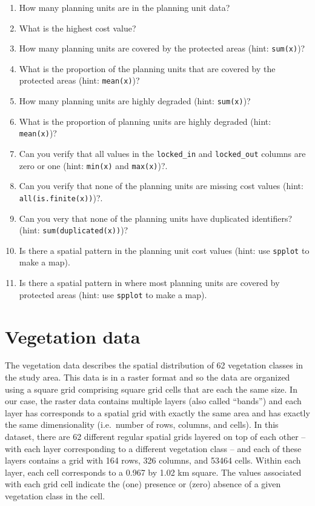 \documentclass[12pt,]{book}
\makeatletter
\providecommand{\tightlist}{%
  \setlength{\itemsep}{0pt}\setlength{\parskip}{0pt}}
\newenvironment{kframe}{%
\medskip{}
\setlength{\fboxsep}{.8em}
 \def\at@end@of@kframe{}%
 \ifinner\ifhmode%
  \def\at@end@of@kframe{\end{minipage}}%
  \begin{minipage}{\columnwidth}%
 \fi\fi%
 \def\FrameCommand##1{\hskip\@totalleftmargin \hskip-\fboxsep
 \colorbox{shadecolor}{##1}\hskip-\fboxsep
     \hskip-\linewidth \hskip-\@totalleftmargin \hskip\columnwidth}%
 \MakeFramed {\advance\hsize-\width
   \@totalleftmargin\z@ \linewidth\hsize
   \@setminipage}}%
 {\par\unskip\endMakeFramed%
 \at@end@of@kframe}
\newenvironment{rmdblock}[1]
  {
  \begin{itemize}
  \renewcommand{\labelitemi}{
    \raisebox{-.7\height}[0pt][0pt]{
      {\setkeys{Gin}{width=3em,keepaspectratio}\texttt{[image: images/\#1]}}
    }
  }
  \setlength{\fboxsep}{1em}
  \begin{kframe}
  \item
  }
  {
  \end{kframe}
  \end{itemize}
  }
\newenvironment{rmdquestion}
  {\begin{rmdblock}{question}}
  {\end{rmdblock}}
\makeatother
\begin{document}
\begin{rmdquestion}
\begin{enumerate}
\def\labelenumi{\arabic{enumi}.}
\tightlist
\item
  How many planning units are in the planning unit data?
\item
  What is the highest cost value?
\item
  How many planning units are covered by the protected areas (hint: \texttt{sum(x)})?
\item
  What is the proportion of the planning units that are covered by the protected areas (hint: \texttt{mean(x)})?
\item
  How many planning units are highly degraded (hint: \texttt{sum(x)})?
\item
  What is the proportion of planning units are highly degraded (hint: \texttt{mean(x)})?
\item
  Can you verify that all values in the \texttt{locked\_in} and \texttt{locked\_out} columns are zero or one (hint: \texttt{min(x)} and \texttt{max(x)})?.
\item
  Can you verify that none of the planning units are missing cost values (hint: \texttt{all(is.finite(x))})?.
\item
  Can you very that none of the planning units have duplicated identifiers? (hint: \texttt{sum(duplicated(x))})?
\item
  Is there a spatial pattern in the planning unit cost values (hint: use \texttt{spplot} to make a map).
\item
  Is there a spatial pattern in where most planning units are covered by protected areas (hint: use \texttt{spplot} to make a map).
\end{enumerate}
\end{rmdquestion}

\clearpage

\hypertarget{vegetation-data}{%
\section{Vegetation data}\label{vegetation-data}}

The vegetation data describes the spatial distribution of 62 vegetation classes in the study area. This data is in a raster format and so the data are organized using a square grid comprising square grid cells that are each the same size. In our case, the raster data contains multiple layers (also called ``bands'') and each layer has corresponds to a spatial grid with exactly the same area and has exactly the same dimensionality (i.e.~number of rows, columns, and cells). In this dataset, there are 62 different regular spatial grids layered on top of each other -- with each layer corresponding to a different vegetation class -- and each of these layers contains a grid with 164 rows, 326 columns, and 53464 cells. Within each layer, each cell corresponds to a 0.967 by 1.02 km square. The values associated with each grid cell indicate the (one) presence or (zero) absence of a given vegetation class in the cell.
\end{document}
